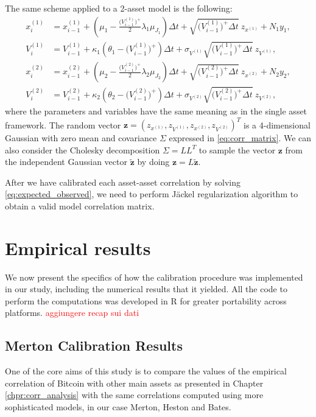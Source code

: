 The same scheme applied to a  2-asset model is the following:
\begin{subequations}
	\label{eq:bates_full_truncation2}
	\begin{align}
	x_i^{(1)} &= x_{i-1}^{(1)} + (\mu_1 -  \frac{\Big(V_{i-1}^{(1)}\Big)^+}{2} \lambda_1\mu_{J_1})\Delta t + \sqrt{\Big(V_{i-1}^{(1)}\Big)^+ \Delta t} \:z_{x^{(1)}} + N_1 y_1, \\
	V_i^{(1)} &= V_{i-1}^{(1)} + \kappa_1(\theta_1 - \Big(V_{i-1}^{(1)}\Big)^+ )\Delta t + \sigma_{V^{(1)}} \sqrt{\Big(V_{i-1}^{(1)}\Big)^+ \Delta t} \: z_{V^(1)},\\
	x_i^{(2)} &= x_{i-1}^{(2)} + (\mu_2 -  \frac{\Big(V_{i-1}^{(2)}\Big)^+}{2} \lambda_2 \mu_{J_2})\Delta t + \sqrt{\Big(V_{i-1}^{(2)}\Big)^+\Delta t} \:z_{x^{(2)}} + N_2 y_2, \\
	V_i^{(2)} &= V_{i-1}^{(2)} + \kappa_2(\theta_2 - \Big(V_{i-1}^{(2)}\Big)^+ )\Delta t + \sigma_{V^{(2)}} \sqrt{\Big(V_{i-1}^{(2)}\Big)^+ \Delta t} \: z_{V^{(2)}},
	\end{align}
\end{subequations}
where the parameters and variables have the same meaning as in the single asset framework.
The random vector $\mathbf{z} = (z_{x^{(1)}}, z_{V^{(1)}}, z_{x^{(2)}}, z_{V^{(2)}})^T$ is a 4-dimensional Gaussian with zero mean and covariance $\Sigma$ expressed in \eqref{eq:corr_matrix}. We can also consider the Cholesky decomposition $\Sigma= L L^T$ to sample the vector $\mathbf{z}$ from the independent Gaussian vector $\mathbf{\tilde{z}}$ by doing $\mathbf{z} = L \mathbf{\tilde{z}}$.

After we have calibrated each asset-asset correlation by solving \eqref{eq:expected_observed}, we need to perform J\"ackel regularization algorithm to obtain a valid model correlation matrix.

\bigskip
\section{Empirical results}
\label{sec:results_cal}
We now present the specifics of how the calibration procedure was implemented in our study, including the numerical results that it yielded.
All the code to perform the computations was developed in R for greater portability across platforms. 	\textcolor{red}{aggiungere recap sui dati}

\subsection{Merton Calibration Results}
One of the core aims of this study is to compare the values of the empirical correlation of Bitcoin with other main assets as presented in Chapter \ref{chpr:corr_analysis} with the same correlations computed using more sophisticated models, in our case Merton, Heston and Bates.

